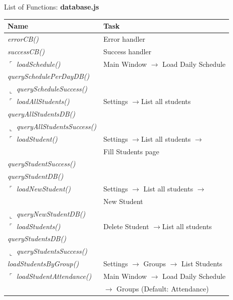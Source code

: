 \begin{bclogo}[couleur=orange!30,logo=\bcbook, arrondi=0.1,ombre=true ] 
{List of Functions: {\bf database.js}}	
\begin{tabular}{ll}
Name                    & Task            \\
\hline
\emph{ errorCB() }                         & Error handler  \\
\emph{ successCB()            }           &  Success handler  \\

$\ulcorner$ \emph{ loadSchedule() }       & { Main Window $\rightarrow$ Load Daily Schedule } \\
\emph{ querySchedulePerDayDB() }         &  \\
$\llcorner $ \emph{ queryScheduleSuccess() }          &  \\


$\ulcorner$ \emph{ loadAllStudents()}         &         Settings $\rightarrow $List all students \\
\emph{ queryAllStudentsDB() }             & \\
$\llcorner$\emph{ queryAllStudentsSuccess()}         &  \\

$\ulcorner$ \emph{ loadStudent()  }                  & Settings  $\rightarrow $List all students  $\rightarrow $ \\
              & Fill Students page\\
\emph{ queryStudentSuccess() }            &  \\
\emph{ queryStudentDB() }                 &  \\
$\ulcorner$ \emph { loadNewStudent()   }     & {Settings $\rightarrow$ List all students $\rightarrow$ } \\
    &   New Student \\
$\llcorner$ \emph{ queryNewStudentDB() }              &  \\
$\ulcorner$\emph{ loadStudents()  }                  & Delete Student $\rightarrow $List all students \\
 \emph{ queryStudentsDB() }                &  \\
$\llcorner$ \emph{ queryStudentsSuccess() }           &   \\





\emph { loadStudentsByGroup()}          & { Settings  $\rightarrow$ Groups $\rightarrow$  List Students  } \\
$\ulcorner$ \emph{ loadStudentAttendance()  }      &  Main Window $\rightarrow$ Load Daily Schedule  \\
                            &   $\rightarrow$ Groups (Default: Attendance)   \\


\end{tabular}
\end{bclogo}
